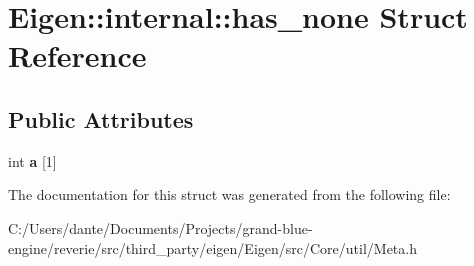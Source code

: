 \hypertarget{struct_eigen_1_1internal_1_1has__none}{}\section{Eigen\+::internal\+::has\+\_\+none Struct Reference}
\label{struct_eigen_1_1internal_1_1has__none}
\subsection*{Public Attributes}
\begin{DoxyCompactItemize}
\item 
\mbox{\label{struct_eigen_1_1internal_1_1has__none_a0035dbde56cb1ea54bf15ca08c1e4c6c}} 
int {\bfseries a} \mbox{[}1\mbox{]}
\end{DoxyCompactItemize}


The documentation for this struct was generated from the following file\+:\begin{DoxyCompactItemize}
\item 
C\+:/\+Users/dante/\+Documents/\+Projects/grand-\/blue-\/engine/reverie/src/third\+\_\+party/eigen/\+Eigen/src/\+Core/util/Meta.\+h\end{DoxyCompactItemize}
